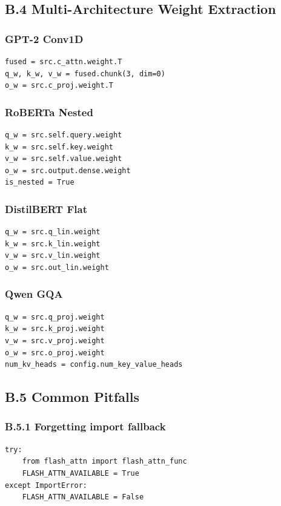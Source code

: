 \subsection{B.4 Multi-Architecture Weight Extraction}

\subsubsection{GPT-2 Conv1D}
\begin{lstlisting}
fused = src.c_attn.weight.T
q_w, k_w, v_w = fused.chunk(3, dim=0)
o_w = src.c_proj.weight.T
\end{lstlisting}

\subsubsection{RoBERTa Nested}
\begin{lstlisting}
q_w = src.self.query.weight
k_w = src.self.key.weight
v_w = src.self.value.weight
o_w = src.output.dense.weight
is_nested = True
\end{lstlisting}

\subsubsection{DistilBERT Flat}
\begin{lstlisting}
q_w = src.q_lin.weight
k_w = src.k_lin.weight
v_w = src.v_lin.weight
o_w = src.out_lin.weight
\end{lstlisting}

\subsubsection{Qwen GQA}
\begin{lstlisting}
q_w = src.q_proj.weight
k_w = src.k_proj.weight
v_w = src.v_proj.weight
o_w = src.o_proj.weight
num_kv_heads = config.num_key_value_heads
\end{lstlisting}

\subsection{B.5 Common Pitfalls}

\subsubsection{B.5.1 Forgetting import fallback}
\begin{lstlisting}
try:
    from flash_attn import flash_attn_func
    FLASH_ATTN_AVAILABLE = True
except ImportError:
    FLASH_ATTN_AVAILABLE = False
\end{lstlisting}

